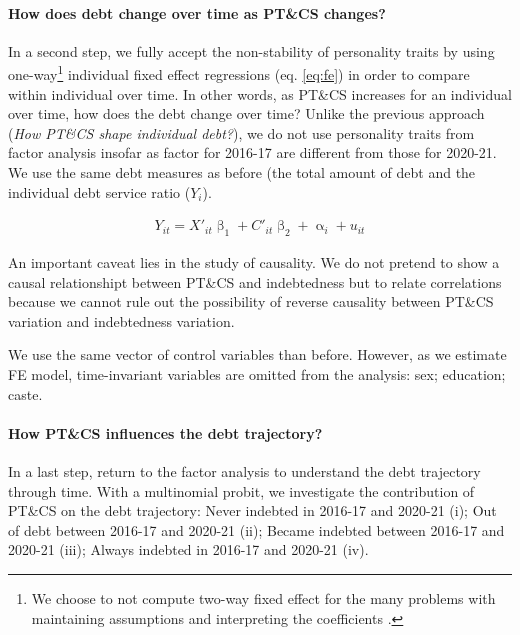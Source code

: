 \documentclass[a4paper, 11pt, onecolumn]{article}
\begin{document}
\paragraph{How does debt change over time as PT\&CS changes?}
In a second step, we fully accept the non-stability of personality traits by using one-way\footnote{We choose to not compute two-way fixed effect for the many problems with maintaining assumptions and interpreting the coefficients \citep{Kropko2020,Imai2020}.} individual fixed effect regressions (eq. \ref{eq:fe}) in order to compare within individual over time.
In other words, as PT\&CS increases for an individual over time, how does the debt change over time?
Unlike the previous approach (\textit{How PT\&CS shape individual debt?}), we do not use personality traits from factor analysis insofar as factor for 2016-17 are different from those for 2020-21. 
We use the same debt measures as before (the total amount of debt and the individual debt service ratio ($Y_{i}$). 

\begin{equation}\label{eq:fe}
\begin{split}
Y_{it}=X'_{it}\upbeta_{1}+C'_{it}\upbeta_{2}+\upalpha_{i}+u_{it}
\end{split}
\end{equation}

An important caveat lies in the study of causality.
We do not pretend to show a causal relationshipt between PT\&CS and indebtedness but to relate correlations because we cannot rule out the possibility of reverse causality between PT\&CS variation and indebtedness variation.

We use the same vector of control variables than before.
However, as we estimate FE model, time-invariant variables are omitted from the analysis: sex; education; caste. 

\paragraph{How PT\&CS influences the debt trajectory?}
In a last step, return to the factor analysis to understand the debt trajectory through time.
With a multinomial probit, we investigate the contribution of PT\&CS on the debt trajectory: Never indebted in 2016-17 and 2020-21 (i); Out of debt between 2016-17 and 2020-21 (ii); Became indebted between 2016-17 and 2020-21 (iii); Always indebted in 2016-17 and 2020-21 (iv).
\end{document}

